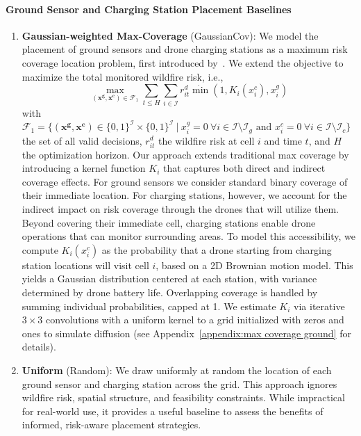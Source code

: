 \documentclass{article}
\begin{document}
\paragraph{Ground Sensor and Charging Station Placement Baselines}

\begin{enumerate}[leftmargin=1.1em, itemsep=0.3em, topsep=0.5em]\label{gaussian-coverage}
    \item \textbf{Gaussian-weighted Max-Coverage} (GaussianCov): We model the placement of ground sensors and drone charging stations as a maximum risk coverage location problem, first introduced by~\cite{MCLPChurchRevelle}. We extend the objective to maximize the total monitored wildfire risk, i.e., $$\max_{(\bm{x^g}, \bm{x^c}) \in \mathcal{F}_1} \sum_{t \leq H}\sum_{i \in \mathcal{I}} r^d_{it} \dot \min(1, K_i(x_i^c), x^g_i)$$ with $\mathcal{F}_1 = \{ (\bm{x^g}, \bm{x^c}) \in \{0,1\}^{\mathcal{I}} \times \{0,1\}^{\mathcal{I}} \ \vert \ x^g_i = 0 \ \forall i \in \mathcal{I} \setminus \mathcal{I}_g \text{ and }  x^c_i = 0 \ \forall i \in \mathcal{I} \setminus \mathcal{I}_c    \}$ the set of all valid decisions, $r^d_{it}$ the wildfire risk at cell $i$ and time $t$, and $H$ the optimization horizon. Our approach extends traditional max coverage by introducing a kernel function $K_i$ that captures both direct and indirect coverage effects. For ground sensors we consider standard binary coverage of their immediate location. For charging stations, however, we account for the indirect impact on risk coverage through the drones that will utilize them. Beyond covering their immediate cell, charging stations enable drone operations that can monitor surrounding areas. To model this accessibility, we compute $K_i(x_i^c)$ as the probability that a drone starting from charging station locations will visit cell $i$, based on a 2D Brownian motion model. This yields a Gaussian distribution centered at each station, with variance determined by drone battery life. Overlapping coverage is handled by summing individual probabilities, capped at 1. We estimate $K_i$ via iterative $3 \times 3$ convolutions with a uniform kernel to a grid initialized with zeros and ones to simulate diffusion (see Appendix~\ref{appendix:max coverage ground} for details).

    \item \textbf{Uniform} (Random): We draw uniformly at random the location of each ground sensor and charging station across the grid. This approach ignores wildfire risk, spatial structure, and feasibility constraints. While impractical for real-world use, it provides a useful baseline to assess the benefits of informed, risk-aware placement strategies.
\end{enumerate}
\end{document}
